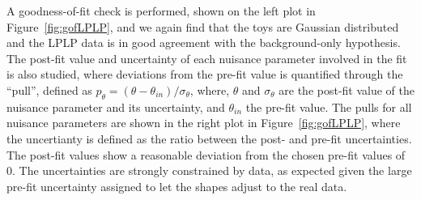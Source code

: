 A goodness-of-fit check is performed, shown on the left plot in Figure~\ref{fig:gofLPLP}, and we again find that the toys are Gaussian distributed and the LPLP data is in good agreement with the background-only hypothesis. The post-fit value and uncertainty of each nuisance parameter involved in the fit is also studied, where deviations from the pre-fit value is quantified through the ``pull'', defined as $p_{\theta} = (\theta - \theta_{in})/\sigma_\theta$, where, $\theta$ and $\sigma_\theta$ are the post-fit value of the nuisance parameter and its uncertainty, and $\theta_{in}$ the pre-fit value. The pulls for all nuisance parameters are shown in the right plot in Figure~\ref{fig:gofLPLP}, where the uncertianty is defined as the ratio between the post- and pre-fit uncertainties. The post-fit values show a reasonable deviation from the chosen pre-fit values of 0. The uncertainties are strongly constrained by data, as expected given the large pre-fit uncertainty assigned to let the shapes adjust to the real data.
